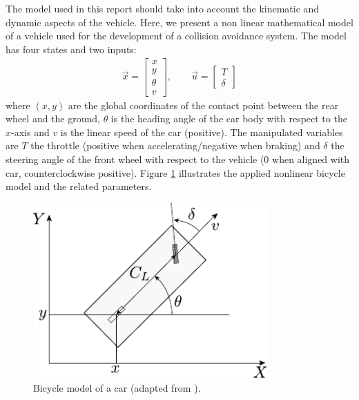 The model used in this report should take into account the kinematic and dynamic aspects of the vehicle. Here, we present a non linear mathematical model of a vehicle used for the development of a collision avoidance system.
The model has four states and two inputs:
\begin{equation}
\begin{array}{cc}
\vec{x}=\begin{bmatrix}
x\\y\\\theta\\v 
\end{bmatrix},\qquad 
\vec{u}=\begin{bmatrix}
T\\\delta 
\end{bmatrix}
\end{array} 
\end{equation}
where $(x,y)$ are the global coordinates of the contact point between the rear wheel and the ground, $\theta$ is the heading angle of the car body with respect to the $x$-axis and $v$ is the linear speed of the car (positive). The manipulated variables are $T$ the throttle (positive when accelerating/negative when braking) and $\delta$ the steering angle of the front wheel with respect to the vehicle ($0$ when aligned with car, counterclockwise positive). Figure \ref{fig:car_model} illustrates the applied nonlinear bicycle model and the related parameters.
\begin{figure}[!h]
	\centering
	\includegraphics[width=0.80\textwidth]{../figure/car_model.pdf}
	\caption{Bicycle model of a car (adapted from \cite{siciliano}).}
	\label{fig:car_model}
\end{figure}

